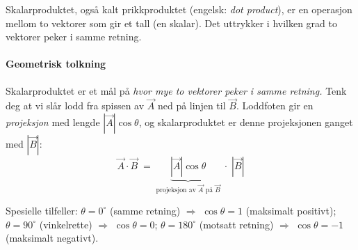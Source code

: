 Skalarproduktet, også kalt prikkproduktet (engelsk: \textit{dot product}), er en operasjon mellom to vektorer som gir et tall (en skalar). Det uttrykker i hvilken grad to vektorer peker i samme retning.


\paragraph{Geometrisk tolkning}

Skalarproduktet er et mål på \emph{hvor mye to vektorer peker i samme retning.} Tenk deg at vi slår lodd fra spissen av $\vec{A}$ ned på linjen til $\vec{B}$. Loddfoten gir en \emph{projeksjon} med lengde $|\vec{A}|\cos\theta$, og skalarproduktet er denne projeksjonen ganget med $|\vec{B}|$:
\[
\vec{A}\cdot\vec{B} \;=\;
\underbrace{|\vec{A}|\cos\theta}_{\text{projeksjon av }\vec{A}\text{ på }\vec{B}}
\;\cdot\; |\vec{B}|
\]

\begin{center}
\end{center}

Spesielle tilfeller: $\theta=0^\circ$ (samme retning) $\Rightarrow$ $\cos\theta=1$ (maksimalt positivt); $\theta=90^\circ$ (vinkelrette) $\Rightarrow$ $\cos\theta=0$; $\theta=180^\circ$ (motsatt retning) $\Rightarrow$ $\cos\theta=-1$ (maksimalt negativt).

